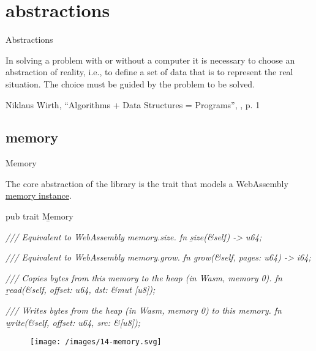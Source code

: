 \documentclass{article}
\begin{document}
\section{abstractions}{Abstractions}
\epigraph{
  In solving a problem with or without a computer it is necessary to choose an abstraction of reality, i.e., to define a set of data that is to represent the real situation.
  The choice must be guided by the problem to be solved.
}{Niklaus Wirth, ``Algorithms + Data Structures = Programs'', , p. 1}

\subsection{memory}{Memory}

The core abstraction of the library is the \href{https://docs.rs/ic-stable-structures/latest/ic_stable_structures/trait.Memory.html}{} trait that models a WebAssembly \href{https://webassembly.github.io/multi-memory/core/exec/runtime.html#memory-instances}{memory instance}.

\begin{code}[rust]
pub trait \b{Memory} {
    \em{/// Equivalent to WebAssembly memory.size.}
    fn \b{size}(&self) -> u64;

    \em{/// Equivalent to WebAssembly memory.grow.}
    fn \b{grow}(&self, pages: u64) -> i64;

    \em{/// Copies bytes from this memory to the heap (in Wasm, memory 0).}
    fn \b{read}(&self, offset: u64, dst: &mut [u8]);

    \em{/// Writes bytes from the heap (in Wasm, memory 0) to this memory.}
    fn \b{write}(&self, offset: u64, src: &[u8]);
}
\end{code}

\begin{figure}[grayscale-diagram]
\texttt{[image: /images/14-memory.svg]}
\end{figure}
\end{document}

